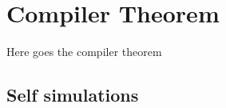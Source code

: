 \section{Compiler Theorem \label{sec:compilerthm}}

Here goes the compiler theorem

\subsection{Self simulations}\label{sec:selfsim}